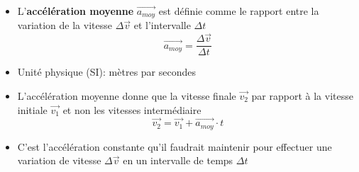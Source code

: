 \documentclass[
    11pt,
    a4paper,
    oneside,
    headinlcude, footinclude,
    twoside,
]{report}
\renewcommand{\vec}[1]{\overrightarrow{#1}}
\begin{document}
\begin{itemize}
\item L'\textbf{accélération moyenne} $\vec{a_{moy}}$ est définie comme
le rapport entre la variation de la vitesse $\Delta \vec v$ et
l'intervalle $\Delta t$ 
\begin{equation}
\vec{a_{moy}} = \frac{\Delta \vec v}{\Delta t}
\end{equation}
\item Unité physique (SI): mètres par secondes 
\item L'accélération moyenne donne que la vitesse finale $\vec{v_{2}}$ par
rapport à la vitesse initiale $\vec{v_{1}}$ et non les vitesses
intermédiaire
\begin{equation}
\vec{v_{2}} = \vec{v_{1}} + \vec{a_{moy}} \cdot t
\end{equation}

\item C'est l'accélération constante qu'il faudrait maintenir pour
effectuer une variation de vitesse $\Delta \vec v$ en un intervalle de
temps $\Delta t$ 


\end{itemize}
\end{document}
